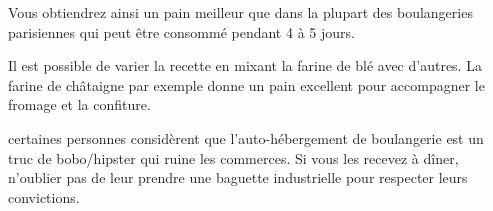 Vous obtiendrez ainsi un pain meilleur que dans la plupart des boulangeries parisiennes qui peut être consommé pendant 4 à 5 jours.

\begin{remarque}

Il est possible de varier la recette en mixant la farine de blé avec d'autres.
La farine de châtaigne par exemple donne un pain excellent pour accompagner le
fromage et la confiture.

\end{remarque}

\begin{attention}

certaines personnes considèrent que l'auto-hébergement de boulangerie est un
truc de bobo/hipster qui ruine les commerces. Si vous les recevez à dîner,
n'oublier pas de leur prendre une baguette industrielle pour respecter leurs
convictions.

\end{attention}